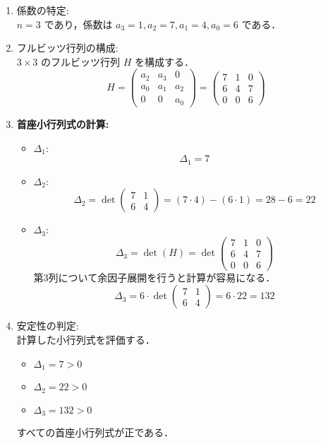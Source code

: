 \documentclass[11pt,a4paper]{ltjsarticle}
\begin{document}
\begin{enumerate}
\item 係数の特定:\\
$n=3$ であり，係数は $a_3=1, a_2=7, a_1=4, a_0=6$ である．

\item フルビッツ行列の構成:\\
$3 \times 3$ のフルビッツ行列 $H$ を構成する．
$$H = \begin{pmatrix}
a_2 & a_3 & 0 \\
a_0 & a_1 & a_2 \\
0 & 0 & a_0
\end{pmatrix} = \begin{pmatrix}
7 & 1 & 0 \\
6 & 4 & 7 \\
0 & 0 & 6
\end{pmatrix}$$

\item \textbf{首座小行列式の計算:}
\begin{itemize}
\item $\Delta_1$:
$$\Delta_1 = 7$$
\item $\Delta_2$:
$$\Delta_2 = \det\begin{pmatrix} 7 & 1 \\ 6 & 4 \end{pmatrix} = (7 \cdot 4) - (6 \cdot 1) = 28 - 6 = 22$$
\item $\Delta_3$:
$$\Delta_3 = \det(H) = \det\begin{pmatrix} 7 & 1 & 0 \\ 6 & 4 & 7 \\ 0 & 0 & 6 \end{pmatrix}$$
第3列について余因子展開を行うと計算が容易になる．
$$\Delta_3 = 6 \cdot \det\begin{pmatrix} 7 & 1 \\ 6 & 4 \end{pmatrix} = 6 \cdot 22 = 132$$
\end{itemize}

\item 安定性の判定:\\
計算した小行列式を評価する．
\begin{itemize}
\item $\Delta_1 = 7 > 0$
\item $\Delta_2 = 22 > 0$
\item $\Delta_3 = 132 > 0$
\end{itemize}
すべての首座小行列式が正である．
\end{enumerate}
\end{document}

